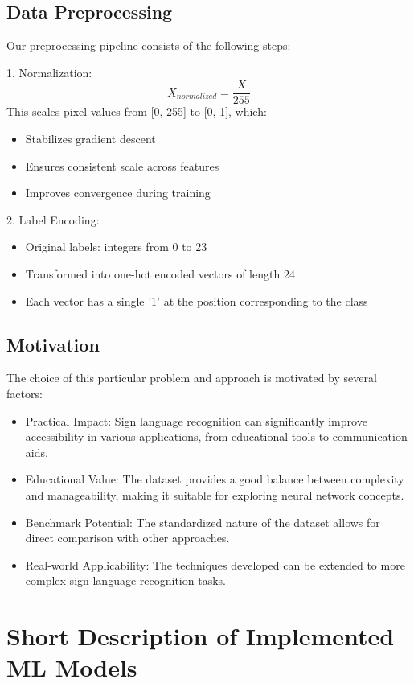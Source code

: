 \documentclass[times,final,english]{revdetua}
\begin{document}
\subsection{Data Preprocessing}
Our preprocessing pipeline consists of the following steps:

1. Normalization:
\begin{equation}
X_{normalized} = \frac{X}{255}
\end{equation}
This scales pixel values from [0, 255] to [0, 1], which:
\begin{itemize}
    \item Stabilizes gradient descent
    \item Ensures consistent scale across features
    \item Improves convergence during training
\end{itemize}

2. Label Encoding:
\begin{itemize}
    \item Original labels: integers from 0 to 23
    \item Transformed into one-hot encoded vectors of length 24
    \item Each vector has a single '1' at the position corresponding to the class
\end{itemize}

\subsection{Motivation}
The choice of this particular problem and approach is motivated by several factors:
\begin{itemize}
    \item Practical Impact: Sign language recognition can significantly improve accessibility in various applications, from educational tools to communication aids.
    \item Educational Value: The dataset provides a good balance between complexity and manageability, making it suitable for exploring neural network concepts.
    \item Benchmark Potential: The standardized nature of the dataset allows for direct comparison with other approaches.
    \item Real-world Applicability: The techniques developed can be extended to more complex sign language recognition tasks.
\end{itemize}

\section{Short Description of Implemented ML Models}
\end{document}
